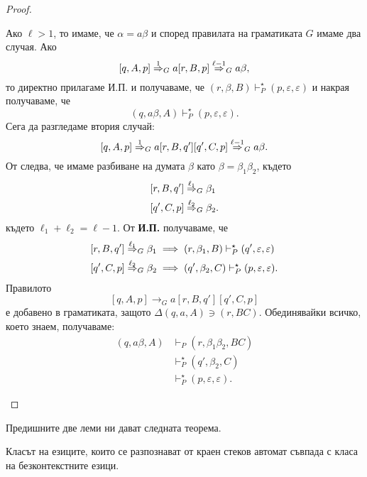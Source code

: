 \begin{proof}
\begin{description}
    Ако $\ell > 1$, то имаме, че $\alpha = a\beta$ и според правилата на граматиката $G$ имаме два случая.
    Ако
    \[[q,A,p] \stackrel{{1}}{\Rightarrow}_G a[r,B,p] \stackrel{{\ell-1}}{\Rightarrow}_G a\beta,\]
    то директно прилагаме И.П. и получаваме, че
    $(r, \beta, B) \vdash^\star_P (p, \varepsilon, \varepsilon)$ и накрая получаваме, че
    \[(q, a\beta, A) \vdash^\star_P (p, \varepsilon, \varepsilon).\]
    Сега да разгледаме втория случай:
    \[[q,A,p] \stackrel{{1}}{\Rightarrow}_G a[r,B,q'][q',C,p] \stackrel{{\ell-1}}{\Rightarrow}_G a\beta.\]
    От  следва, че имаме разбиване на думата $\beta$ като $\beta = \beta_1\beta_2$, където 
    \begin{align*}
      & [r,B,q'] \stackrel{{\ell_1}}{\Rightarrow}_G \beta_1\\
      & [q',C,p] \stackrel{{\ell_2}}{\Rightarrow}_G \beta_2.
    \end{align*}
    където $\ell_1 + \ell_2 = \ell - 1$.
    От {\bf И.П.} получаваме, че 
    \begin{align*}
      & [r,B,q'] \stackrel{{\ell_1}}{\Rightarrow}_G \beta_1 \implies (r,\beta_1,B) \vdash^\star_P (q',\varepsilon,\varepsilon) \\
      & [q',C,p] \stackrel{{\ell_2}}{\Rightarrow}_G \beta_2 \implies (q',\beta_2,C) \vdash^\star_P (p,\varepsilon,\varepsilon).
    \end{align*}
    Правилото
    \[[q,A,p] \rightarrow_G a[r,B,q'][q',C,p]\]
    е добавено в граматиката, защото $\Delta(q,a,A) \ni (r, BC)$. 
    Обединявайки всичко, което знаем, получаваме:
    \begin{align*}
      (q, a\beta, A) & \vdash_P (r, \beta_1\beta_2, BC)\\
                     & \vdash^\star_P (q', \beta_2, C)\\
                     & \vdash^\star_P (p, \varepsilon, \varepsilon).
    \end{align*}    
  \end{description}
\end{proof}

Предишните две леми ни дават следната теорема.
\begin{framed}
\begin{thm}
  \label{th:push-down-context-free}
  Класът на езиците, които се разпознават от краен стеков автомат съвпада с
  класа на безконтекстните езици.
\end{thm}
\end{framed}

